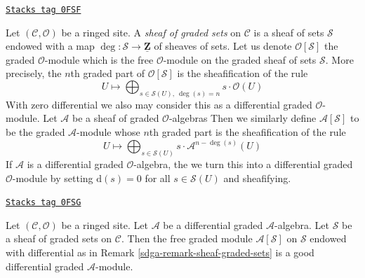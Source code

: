 \begin{remark}
\label{sdga-remark-sheaf-graded-sets}
\href{https://stacks.math.columbia.edu/tag/0FSF}{\texttt{Stacks tag 0FSF}}

Let $(\mathcal{C}, \mathcal{O})$ be a ringed site. A
{\it sheaf of graded sets} on $\mathcal{C}$ is a sheaf
of sets $\mathcal{S}$ endowed with a map
$\deg : \mathcal{S} \to \underline{\mathbf{Z}}$
of sheaves of sets. Let us denote $\mathcal{O}[\mathcal{S}]$
the graded $\mathcal{O}$-module which is the
free $\mathcal{O}$-module on the graded sheaf of sets $\mathcal{S}$.
More precisely, the $n$th graded part of
$\mathcal{O}[\mathcal{S}]$ is the sheafification of the rule
$$
U \longmapsto
\bigoplus\nolimits_{s \in \mathcal{S}(U),\ \deg(s) = n} s \cdot \mathcal{O}(U)
$$
With zero differential we also may consider this as a
differential graded $\mathcal{O}$-module.
Let $\mathcal{A}$ be a sheaf of graded $\mathcal{O}$-algebras
Then we similarly define $\mathcal{A}[\mathcal{S}]$ to be the
graded $\mathcal{A}$-module whose $n$th graded part is the
sheafification of the rule
$$
U \longmapsto
\bigoplus\nolimits_{s \in \mathcal{S}(U)} s \cdot \mathcal{A}^{n - \deg(s)}(U)
$$
If $\mathcal{A}$ is a differential graded $\mathcal{O}$-algebra, the
we turn this into a differential graded $\mathcal{O}$-module
by setting $\text{d}(s) = 0$ for all $s \in \mathcal{S}(U)$
and sheafifying.
\end{remark}

\begin{lemma}
\label{sdga-lemma-free-graded-module-good}
\href{https://stacks.math.columbia.edu/tag/0FSG}{\texttt{Stacks tag 0FSG}}

Let $(\mathcal{C}, \mathcal{O})$ be a ringed site.
Let $\mathcal{A}$ be a differential graded $\mathcal{A}$-algebra.
Let $\mathcal{S}$ be a sheaf of graded sets on $\mathcal{C}$.
Then the free graded module $\mathcal{A}[\mathcal{S}]$
on $\mathcal{S}$ endowed with differential as in
Remark \ref{sdga-remark-sheaf-graded-sets}
is a good differential graded $\mathcal{A}$-module.
\end{lemma}

